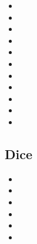\begin{multicols}{2}
\begin{itemize}
	\item \glyphdemo{\controllerLJoystickUp}
	\item \glyphdemo{\controllerLJoystickLeft}
	\item \glyphdemo{\controllerLJoystickDown}
	\item \glyphdemo{\controllerLJoystickRight}
	\item \glyphdemo{\controllerLJoystickPress}
	\item \glyphdemo{\controllerMouse}
	\item \glyphdemo{\controllerMouseLMB}
	\item \glyphdemo{\controllerMouseRMB}
	\item \glyphdemo{\controllerMouseScroll}
	\item \glyphdemo{\controllerMouseScrollUp}
	\item \glyphdemo{\controllerMouseScrollDown}
\end{itemize}
\end{multicols}

\subsection{Dice}

\begin{multicols}{2}
\begin{itemize}
	\item \glyphdemo{\diceOne}
	\item \glyphdemo{\diceTwo}
	\item \glyphdemo{\diceThree}
	\item \glyphdemo{\diceFour}
	\item \glyphdemo{\diceFive}
	\item \glyphdemo{\diceSix}
\end{itemize}
\end{multicols}

\newpage
